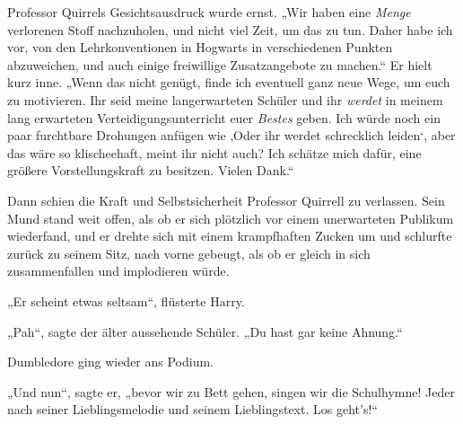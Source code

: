 Professor Quirrels Gesichtsausdruck wurde ernst. „Wir haben eine \emph{Menge} verlorenen Stoff nachzuholen, und nicht viel Zeit, um das zu tun. Daher habe ich vor, von den Lehrkonventionen in Hogwarts in verschiedenen Punkten abzuweichen, und auch einige freiwillige Zusatzangebote zu machen.“ Er hielt kurz inne. „Wenn das nicht genügt, finde ich eventuell ganz neue Wege, um euch zu motivieren. Ihr seid meine langerwarteten Schüler und ihr \emph{werdet} in meinem lang erwarteten Verteidigungsunterricht euer \emph{Bestes} geben. Ich würde noch ein paar furchtbare Drohungen anfügen wie ‚Oder ihr werdet schrecklich leiden‘, aber das wäre so klischeehaft, meint ihr nicht auch? Ich schätze mich dafür, eine größere Vorstellungskraft zu besitzen. Vielen Dank.“

Dann schien die Kraft und Selbstsicherheit Professor Quirrell zu verlassen. Sein Mund stand weit offen, als ob er sich plötzlich vor einem unerwarteten Publikum wiederfand, und er drehte sich mit einem krampfhaften Zucken um und schlurfte zurück zu seinem Sitz, nach vorne gebeugt, als ob er gleich in sich zusammenfallen und implodieren würde.

„Er scheint etwas seltsam“, flüsterte Harry.

„Pah“, sagte der älter aussehende Schüler. „Du hast gar keine Ahnung.“

Dumbledore ging wieder ans Podium.

„Und nun“, sagte er, „bevor wir zu Bett gehen, singen wir die Schulhymne! Jeder nach seiner Lieblingsmelodie und seinem Lieblingstext. Los geht's!“

